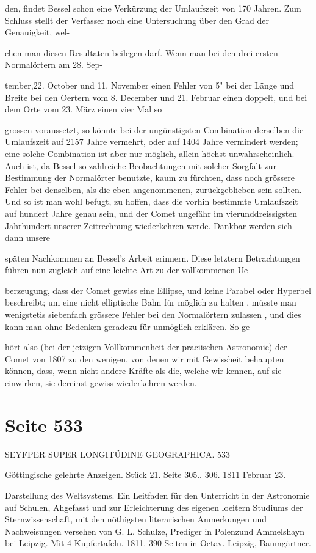 \documentclass[10pt,a4paper]{article}
\begin{document}
den, findet Bessel schon eine Verkürzung der Umlaufszeit von 170 Jahren. Zum Schluss stellt der Verfasser noch eine Untersuchung über den Grad der Genauigkeit, wel-

chen man diesen Resultaten beilegen darf. Wenn man bei den drei ersten Normalörtern am 28. Sep-

tember,22. October und 11. November einen Fehler von 5" bei der Länge und Breite bei den Oertern vom 8. December und 21. Februar einen doppelt, und bei dem Orte vom 23. März einen vier Mal so

grossen voraussetzt, so könnte bei der ungünstigsten Combination derselben die Umlaufszeit auf 2157 Jahre vermehrt, oder auf 1404 Jahre vermindert werden; eine solche Combination ist aber nur möglich, allein höchst unwahrscheinlich. Auch ist, da Bessel so zahlreiche Beobachtungen mit solcher Sorgfalt zur Bestimmung der Normalörter benutzte, kaum zu fürchten, dass noch grössere Fehler bei denselben, als die eben angenommenen, zurückgeblieben sein sollten. Und so ist man wohl befugt, zu hoffen, dass die vorhin bestimmte Umlaufszeit auf hundert Jahre genau sein, und der Comet ungefähr im vierunddreissigsten Jahrhundert unserer Zeitrechnung wiederkehren werde. Dankbar werden sich dann unsere

späten Nachkommen an Bessel's Arbeit erinnern. Diese letztern Betrachtungen führen nun zugleich auf eine leichte Art zu der vollkommenen Ue-

berzeugung, dass der Comet gewiss eine Ellipse, und keine Parabel oder Hyperbel beschreibt; um eine nicht elliptische Bahn für möglich zu halten , müsste man wenigstetis siebenfach grössere Fehler bei den Normalörtern zulassen , und dies kann man ohne Bedenken geradezu für unmöglich erklären. So ge-

hört also (bei der jetzigen Vollkommenheit der praciischen Astronomie) der Comet von 1807 zu den wenigen, von denen wir mit Gewissheit behaupten können, dass, wenn nicht andere Kräfte als die, welche wir kennen, auf sie einwirken, sie dereinst gewiss wiederkehren werden.


\newpage
\section*{Seite 533}
SEYFPER SUPER LONGITÜDINE GEOGRAPHICA. 533

Göttingische gelehrte Anzeigen. Stück 21. Seite 305.. 306. 1811 Februar 23.

Darstellung des Weltsystems. Ein Leitfaden für den Unterricht in der Astronomie auf Schulen, Ahgefasst und zur Erleichterung des eigenen loeitern Studiums der Sternwissenschaft, mit den nöthigsten literarischen Anmerkungen und Nachweisungen versehen von G. L. Schulze, Prediger in Polenzund Ammelshayn bei Leipzig. Mit 4 Kupfertafeln. 1811. 390 Seiten in Octav. Leipzig, Baumgärtner.
\end{document}
